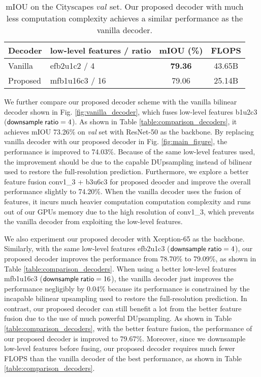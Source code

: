 \documentclass[10pt,twocolumn,letterpaper]{article}
\newcommand{\1}{{\mathbbm{1}}}
\begin{document}
\begin{table}
\begin{center}
\small
\begin{tabular}{  l|l|c|c  }
\hline
Decoder & low-level features / ratio & mIOU (\%) & FLOPS \\
\hline\hline
Vanilla & efb2u1c2 / 4 & \textbf{79.36} & 43.65B \\
Proposed & mfb1u16c3 / 16 & 79.06 & 25.14B \\
\hline
\end{tabular}
\end{center}
\caption{mIOU on the Cityscapes $val$ set. Our proposed decoder with much less computation complexity achieves a similar performance as the vanilla decoder.}
\label{table:comparison_decoders_cityscapes}
\end{table}

We further compare our proposed decoder scheme with the vanilla bilinear decoder shown in Fig. \ref{fig:vanilla_decoder}, which fuses low-level features b1u2c3 (${\sf downsample\; ratio} = 4$). As shown in Table \ref{table:comparison_decoders}, it achieves mIOU 73.26\% on {\it val} set with ResNet-50 as the backbone. By replacing vanilla decoder with our proposed decoder in Fig. \ref{fig:main_figure}, the performance is improved to 74.03\%. Because of the same low-level features used, the improvement should be due to the capable DUpsampling instead of bilinear used to restore the full-resolution prediction. Furthermore, we explore a better feature fusion conv1\_3 + b3u6c3 for proposed deocder and improve the overall performance slightly to 74.20\%. When the vanilla decoder uses the fusion of features, it incurs much heavier computation computation complexity and runs out of our GPUs memory due to the high resolution of conv1\_3, which prevents the vanilla decoder from exploiting the low-level features.

We also experiment our proposed decoder with Xception-65 as the backbone. Similarly, with the same low-level features efb2u1c3 (${\sf downsample\; ratio} = 4$), our proposed decoder improves the performance from 78.70\% to 79.09\%, as shown in Table \ref{table:comparison_decoders}. When using a better low-level features mfb1u16c3 (${\sf downsample\; ratio} = 16$), the vanilla decoder just improves the performance negligibly by 0.04\% because its performance is constrained by the incapable bilinear upsampling used to restore the full-resolution prediction. In contrast, our proposed decoder can still benefit a lot from the better feature fusion due to the use of much powerful DUpsampling. As shown in Table \ref{table:comparison_decoders}, with the better feature fusion, the performance of our proposed decoder is improved to 79.67\%. Moreover, since we downsample low-level features before fusing, our proposed decoder requires much fewer FLOPS than the vanilla decoder of the best performance, as shown in Table \ref{table:comparison_decoders}.
\end{document}

